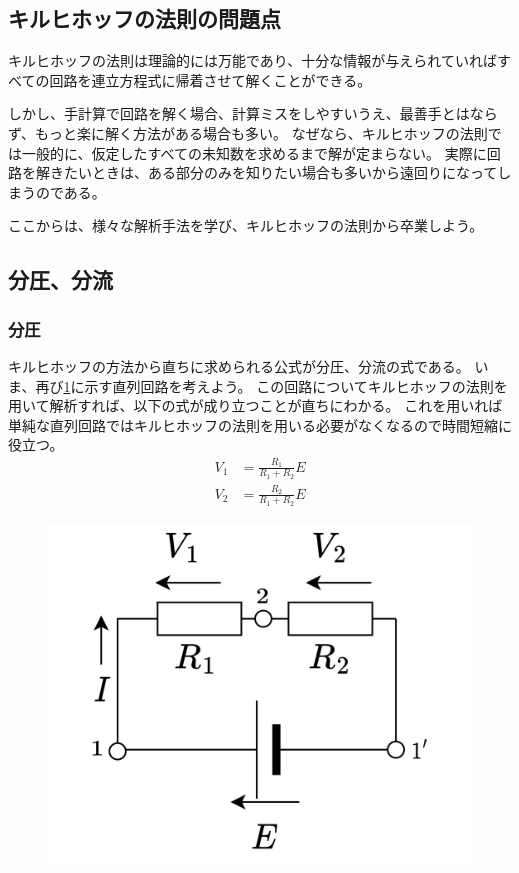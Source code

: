 \documentclass{ltjsreport}
\begin{document}
\subsection{キルヒホッフの法則の問題点}
キルヒホッフの法則は理論的には万能であり、十分な情報が与えられていればすべての回路を連立方程式に帰着させて解くことができる。

しかし、手計算で回路を解く場合、計算ミスをしやすいうえ、最善手とはならず、もっと楽に解く方法がある場合も多い。
なぜなら、キルヒホッフの法則では一般的に、仮定したすべての未知数を求めるまで解が定まらない。
実際に回路を解きたいときは、ある部分のみを知りたい場合も多いから遠回りになってしまうのである。

ここからは、様々な解析手法を学び、キルヒホッフの法則から卒業しよう。
\subsection{分圧、分流}
\subsubsection{分圧}
キルヒホッフの方法から直ちに求められる公式が分圧、分流の式である。
いま、再び\ref{fig:volt_partial}に示す直列回路を考えよう。
この回路についてキルヒホッフの法則を用いて解析すれば、以下の式が成り立つことが直ちにわかる。
これを用いれば単純な直列回路ではキルヒホッフの法則を用いる必要がなくなるので時間短縮に役立つ。
\begin{align}
  V_1 &= \frac{R_1}{R_1+R_2}E\\
  V_2 &= \frac{R_2}{R_1+R_2}E
\end{align}


\begin{figure}[tb]
  \centering
  \includegraphics[keepaspectratio, scale=0.07]
       {img/ohm2.drawio.png}
  \caption{}
  \label{fig:volt_partial}
 \end{figure}
\end{document}
